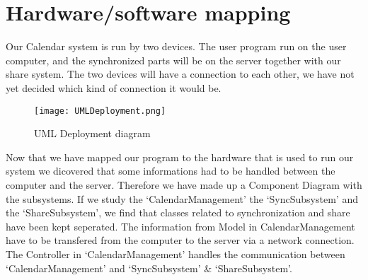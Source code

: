 \section{Hardware/software mapping}

Our Calendar system is run by two devices. The user program run on the user computer, and the synchronized parts will be on the server together with our share system. The two devices will have a connection to each other, we have not yet decided which kind of connection it would be.

\begin{figure}[h]
\centering
\texttt{[image: UMLDeployment.png]}
\caption{UML Deployment diagram \label{overflow}}
\label{figur:UMLDeployment}
\end{figure}

Now that we have mapped our program to the hardware that is used to run our system we dicovered that some informations had to be handled between the computer and the server. Therefore we have made up a Component Diagram with the subsystems. If we study the ‘CalendarManagement’ the ‘SyncSubsystem’ and the ‘ShareSubsystem’, we find that classes related to synchronization and share have been kept seperated. The information from Model in CalendarManagement have to be transfered from the computer to the server via a network connection. The Controller in ‘CalendarManagement’ handles the communication between ‘CalendarManagement’ and ‘SyncSubsystem’ \& ‘ShareSubsystem’.